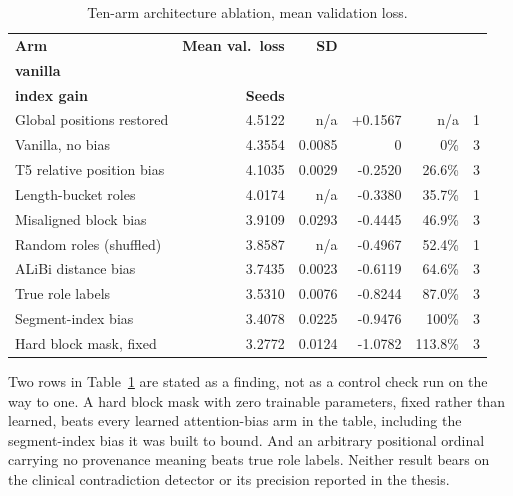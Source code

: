 \begin{table}[H]
\caption[Ten-arm architecture ablation results]{Ten-arm architecture ablation, mean validation loss.}
\label{sup:tab:ablation}
\centering
\small
\begin{tabular}{lrrrrr}
\toprule
\textbf{Arm} & \textbf{Mean val.\ loss} & \textbf{SD} & \shortstack[r]{\textbf{$\Delta$ vs.}\\\textbf{vanilla}} &
\shortstack[r]{\textbf{\% of segment-}\\\textbf{index gain}} & \textbf{Seeds} \\
\midrule
Global positions restored  & 4.5122 & n/a & +0.1567 & n/a     & 1 \\
Vanilla, no bias           & 4.3554 & 0.0085 & 0       & 0\%     & 3 \\
T5 relative position bias  & 4.1035 & 0.0029 & -0.2520 & 26.6\%  & 3 \\
Length-bucket roles        & 4.0174 & n/a & -0.3380 & 35.7\%  & 1 \\
Misaligned block bias      & 3.9109 & 0.0293 & -0.4445 & 46.9\%  & 3 \\
Random roles (shuffled)    & 3.8587 & n/a & -0.4967 & 52.4\%  & 1 \\
ALiBi distance bias        & 3.7435 & 0.0023 & -0.6119 & 64.6\%  & 3 \\
True role labels           & 3.5310 & 0.0076 & -0.8244 & 87.0\%  & 3 \\
Segment-index bias         & 3.4078 & 0.0225 & -0.9476 & 100\%   & 3 \\
Hard block mask, fixed     & 3.2772 & 0.0124 & -1.0782 & 113.8\% & 3 \\
\bottomrule
\end{tabular}
\end{table}

Two rows in Table~\ref{sup:tab:ablation} are stated as a finding, not as a
control check run on the way to one. A hard block mask with zero trainable
parameters, fixed rather than learned, beats every learned attention-bias arm
in the table, including the segment-index bias it was built to bound. And an
arbitrary positional ordinal carrying no provenance meaning beats true
role labels. Neither result bears on the clinical contradiction detector or
its precision reported in the thesis.

